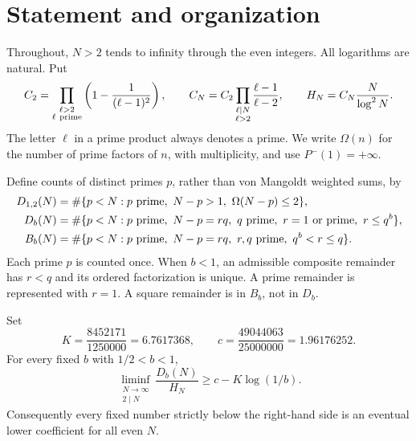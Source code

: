 \section{Statement and organization}
\label{sec:current-statement}

Throughout, $N>2$ tends to infinity through the even integers.  All
logarithms are natural.  Put
\begin{equation}
 C_2=\prod_{\substack{\ell>2\\\ell\ {\rm prime}}}
       \left(1-\frac1{(\ell-1)^2}\right),\qquad
 C_N=C_2\prod_{\substack{\ell\mid N\\\ell>2}}
       \frac{\ell-1}{\ell-2},\qquad
 H_N=C_N\frac{N}{\log^2N}.
 \label{eq:current-normalization}
\end{equation}
The letter $\ell$ in a prime product always denotes a prime.  We write
$\Omega(n)$ for the number of prime factors of $n$, with multiplicity,
and use $P^-(1)=+\infty$.

Define counts of distinct primes $p$, rather than von Mangoldt weighted
sums, by
\begin{align}
 D_{1,2}(N)
   &=\#\{p<N:p\ {\rm prime},\ N-p>1,\ \Omega(N-p)\le2\},
       \label{eq:current-d12}\\
 D_b(N)
   &=\#\{p<N:p\ {\rm prime},\ N-p=rq,\ q\ {\rm prime},
          \ r=1\text{ or prime},\ r\le q^b\},
       \label{eq:current-db}\\
 B_b(N)
   &=\#\{p<N:p\ {\rm prime},\ N-p=rq,\ r,q\ {\rm prime},
          \ q^b<r\le q\}.                       \label{eq:current-bb}
\end{align}
Each prime $p$ is counted once.  When $b<1$, an admissible composite
remainder has $r<q$ and its ordered factorization is unique.  A prime
remainder is represented with $r=1$.  A square remainder is in $B_b$,
not in $D_b$.

\begin{theorem}
\label{thm:current-main}
Set
\begin{equation}
 K=\frac{8452171}{1250000}=6.7617368,\qquad
 c=\frac{49044063}{25000000}=1.96176252.
 \label{eq:current-safe-constants}
\end{equation}
For every fixed $b$ with $1/2<b<1$,
\begin{equation}
 \liminf_{\substack{N\to\infty\\2\mid N}}
       \frac{D_b(N)}{H_N}\ge c-K\log(1/b).
 \label{eq:current-general-theorem}
\end{equation}
Consequently every fixed number strictly below the right-hand side
is an eventual lower coefficient for all even $N$.
\end{theorem}

